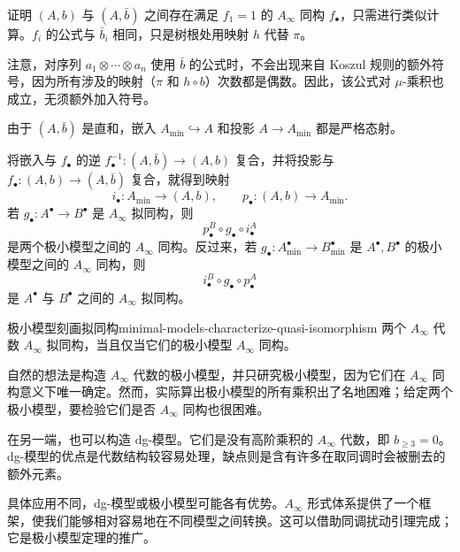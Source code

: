 证明 $(A,b)$ 与 $(A,\bar b)$ 之间存在满足 $f_1=1$ 的 $A_\infty$ 同构 $f_\bullet$，只需进行类似计算。$f_i$ 的公式与 $\bar b_i$ 相同，只是树根处用映射 $h$ 代替 $\pi$。

\begin{note}
注意，对序列 $a_1\otimes\cdots\otimes a_n$ 使用 $\bar b$ 的公式时，不会出现来自 Koszul 规则的额外符号，因为所有涉及的映射（$\pi$ 和 $h\circ b$）次数都是偶数。因此，该公式对 $\mu$-乘积也成立，无须额外加入符号。

由于 $(A,\bar b)$ 是直和，嵌入 $A_{\min}\hookrightarrow A$ 和投影 $A\to A_{\min}$ 都是严格态射。

将嵌入与 $f_\bullet$ 的逆 $f_\bullet^{-1}\colon(A,\bar b)\to(A,b)$ 复合，并将投影与 $f_\bullet\colon(A,b)\to(A,\bar b)$ 复合，就得到映射
\[
  i_\bullet\colon A_{\min}\to(A,b),\qquad
  p_\bullet\colon(A,b)\to A_{\min}.
\]
若 $g_\bullet\colon A^\bullet\to B^\bullet$ 是 $A_\infty$ 拟同构，则
\[
  p_\bullet^B\circ g_\bullet\circ i_\bullet^A
\]
是两个极小模型之间的 $A_\infty$ 同构。反过来，若 $g_\bullet\colon A_{\min}^\bullet\to B_{\min}^\bullet$ 是 $A^\bullet,B^\bullet$ 的极小模型之间的 $A_\infty$ 同构，则
\[
  i_\bullet^B\circ g_\bullet\circ p_\bullet^A
\]
是 $A^\bullet$ 与 $B^\bullet$ 之间的 $A_\infty$ 拟同构。
\end{note}

\begin{corollary}{极小模型刻画拟同构}{minimal-models-characterize-quasi-isomorphism}
两个 $A_\infty$ 代数 $A_\infty$ 拟同构，当且仅当它们的极小模型 $A_\infty$ 同构。
\end{corollary}

自然的想法是构造 $A_\infty$ 代数的极小模型，并只研究极小模型，因为它们在 $A_\infty$ 同构意义下唯一确定。然而，实际算出极小模型的所有乘积出了名地困难；给定两个极小模型，要检验它们是否 $A_\infty$ 同构也很困难。

在另一端，也可以构造 dg-模型。它们是没有高阶乘积的 $A_\infty$ 代数，即 $b_{\geq3}=0$。dg-模型的优点是代数结构较容易处理，缺点则是含有许多在取同调时会被删去的额外元素。

具体应用不同，dg-模型或极小模型可能各有优势。$A_\infty$ 形式体系提供了一个框架，使我们能够相对容易地在不同模型之间转换。这可以借助同调扰动引理完成；它是极小模型定理的推广。

